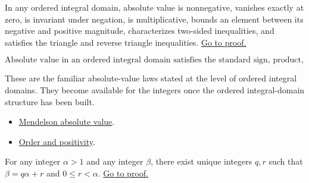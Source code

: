 \begin{theorem}
\label{thm:men-absolute-value-properties}
In any ordered integral domain, absolute value is nonnegative, vanishes
exactly at zero, is invariant under negation, is multiplicative, bounds an
element between its negative and positive magnitude, characterizes two-sided
inequalities, and satisfies the triangle and reverse triangle inequalities.
\hyperref[prf:men-absolute-value-properties]{Go to proof.}
\end{theorem}

\begin{remark*}
\[
  \text{Absolute value in an ordered integral domain satisfies the standard
  sign, product, interval, triangle, and reverse-triangle laws.}
\]
\end{remark*}

\begin{remark*}[Interpretation]
These are the familiar absolute-value laws stated at the level of ordered
integral domains. They become available for the integers once the ordered
integral-domain structure has been built.
\end{remark*}

\begin{dependencies}
\begin{itemize}
  \item \hyperref[def:men-absolute-value]{Mendelson absolute value}.
  \item \hyperref[thm:men-order-positivity]{Order and positivity}.
\end{itemize}
\end{dependencies}

\begin{theorem}
\label{thm:men-euclidean-division}
For any integer \(\alpha>1\) and any integer \(\beta\), there exist unique
integers \(q,r\) such that \(\beta=q\alpha+r\) and \(0\leq r<\alpha\).
\hyperref[prf:men-euclidean-division]{Go to proof.}
\end{theorem}

